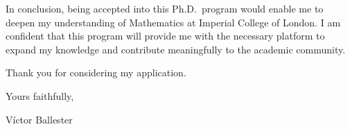 \documentclass{letter}
\newcommand{\uni}{Imperial College of London}
\begin{document}
\begin{letter}
  In conclusion, being accepted into this Ph.D.\ program would enable me to deepen my understanding of Mathematics at \uni. I am confident that this program will provide me with the necessary platform to expand my knowledge and contribute meaningfully to the academic community.

  Thank you for considering my application.
  \bigskip

  Yours faithfully,

  Víctor Ballester

\end{letter}
\end{document}
